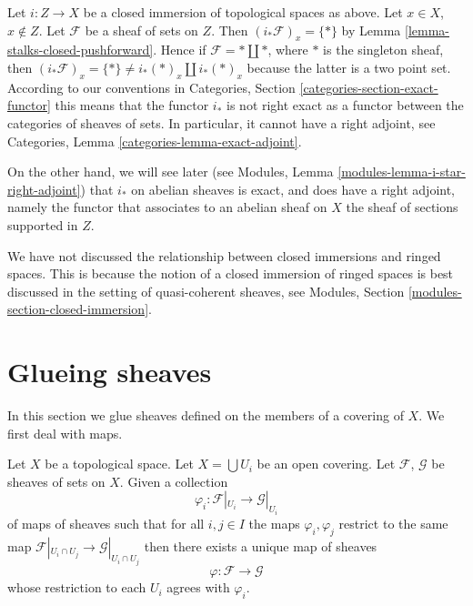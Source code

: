 \begin{remark}
\label{remark-i-star-not-exact}
Let $i : Z \to X$ be a closed immersion of topological spaces as above.
Let $x \in X$, $x \not \in Z$. Let $\mathcal{F}$ be a sheaf of sets
on $Z$. Then $(i_*\mathcal{F})_x = \{ * \}$
by Lemma \ref{lemma-stalks-closed-pushforward}.
Hence if $\mathcal{F} = * \amalg *$, where
$*$ is the singleton sheaf, then
$(i_*\mathcal{F})_x = \{*\} \not = i_*(*)_x \amalg i_*(*)_x$
because the latter is a two point set.
According to our conventions in
Categories, Section \ref{categories-section-exact-functor}
this means that the functor $i_*$ is not right exact
as a functor between the categories of sheaves of sets.
In particular, it cannot have a right adjoint, see
Categories, Lemma \ref{categories-lemma-exact-adjoint}.

\medskip\noindent
On the other hand, we will see later (see
Modules, Lemma \ref{modules-lemma-i-star-right-adjoint})
that $i_*$ on abelian sheaves is exact, and does have a right
adjoint, namely the functor that associates to an abelian sheaf on $X$
the sheaf of sections supported in $Z$.
\end{remark}

\begin{remark}
\label{remark-closed-immersion-spaces}
We have not discussed the relationship between closed immersions
and ringed spaces. This is because the notion of a closed immersion
of ringed spaces is best discussed in the setting of quasi-coherent
sheaves, see Modules, Section \ref{modules-section-closed-immersion}.
\end{remark}

\section{Glueing sheaves}
\label{section-glueing-sheaves}

\noindent
In this section we glue sheaves defined on the members of a covering of $X$.
We first deal with maps.

\begin{lemma}
\label{lemma-glue-maps}
Let $X$ be a topological space.
Let $X = \bigcup U_i$ be an open covering.
Let $\mathcal{F}$, $\mathcal{G}$ be sheaves of sets on $X$.
Given a collection
$$
\varphi_i :
\mathcal{F}|_{U_i}
\longrightarrow
\mathcal{G}|_{U_i}
$$
of maps of sheaves such that for all $i, j \in I$ the maps
$\varphi_i, \varphi_j$ restrict to the same map
$\mathcal{F}|_{U_i \cap U_j} \to \mathcal{G}|_{U_i \cap U_j}$
then there exists a unique map of sheaves
$$
\varphi :
\mathcal{F}
\longrightarrow
\mathcal{G}
$$
whose restriction to each $U_i$ agrees with $\varphi_i$.
\end{lemma}


